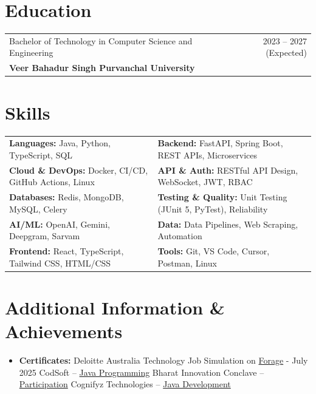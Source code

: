 \documentclass[a4paper,10pt]{article}
\begin{document}
\section{Education}
\begin{tabularx}{\linewidth}{ @{}l r@{} }
Bachelor of Technology in Computer Science and Engineering & \hfill 2023 -- 2027 (Expected) \\[2pt]
\textbf{Veer Bahadur Singh Purvanchal University} &
\end{tabularx}

\section{Skills}
\begin{tabularx}{\linewidth}{@{}X X@{}}
\textbf{Languages:} Java, Python, TypeScript, SQL & \textbf{Backend:} FastAPI, Spring Boot, REST APIs, Microservices \\[2pt]
\textbf{Cloud \& DevOps:} Docker, CI/CD, GitHub Actions, Linux & \textbf{API \& Auth:} RESTful API Design, WebSocket, JWT, RBAC \\[2pt]
\textbf{Databases:} Redis, MongoDB, MySQL, Celery & \textbf{Testing \& Quality:} Unit Testing (JUnit 5, PyTest), Reliability \\[2pt]
\textbf{AI/ML:} OpenAI, Gemini, Deepgram, Sarvam & \textbf{Data:} Data Pipelines, Web Scraping, Automation \\[2pt]
\textbf{Frontend:} React, TypeScript, Tailwind CSS, HTML/CSS & \textbf{Tools:} Git, VS Code, Cursor, Postman, Linux
\end{tabularx}

\section{Additional Information \& Achievements}
\begin{itemize}[nosep,after=\strut, leftmargin=1em, itemsep=0pt,label=--]
\item \textbf{Certificates:} Deloitte Australia Technology Job Simulation on \href{https://drive.google.com/file/d/1dP-lXbwKe-u69BI3Z1gX4FDZZyn8Cr5n/view}{Forage} - July 2025 \textbar{} CodSoft -- \href{https://drive.google.com/file/d/1TeMMQSghHzaITFT6s5T-Z1C5Xvn22QMs/view}{Java Programming} \textbar{} Bharat Innovation Conclave -- \href{https://drive.google.com/file/d/11uL40HfYTX029SwxAb8JDQUY9_X5_uaO/view?usp=drive_link}{Participation} \textbar{} Cognifyz Technologies -- \href{https://drive.google.com/file/d/1eQty7zGGwGZ_mdupwpvc1sC22R4D-R7X/view}{Java Development}
\end{itemize}
\end{document}
